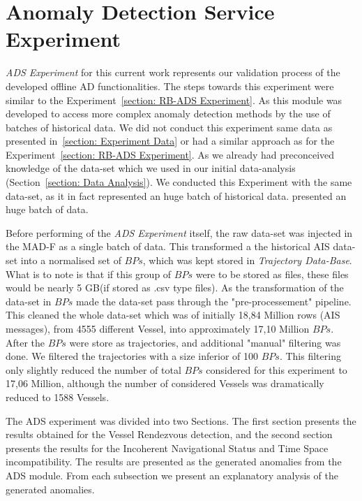 \section{Anomaly Detection Service Experiment}
\emph{ADS Experiment} for this current work represents our validation process of the developed offline AD functionalities. The steps towards this experiment were similar to the Experiment~\ref{section: RB-ADS Experiment}. As this module was developed to access more complex anomaly detection methods by the use of batches of historical data. We did not conduct this experiment same data as presented in~\ref{section: Experiment Data} or had a similar approach as for the Experiment~\ref{section: RB-ADS Experiment}.
As we already had preconceived knowledge of the data-set which we used in our initial data-analysis (Section~\ref{section: Data Analysis}). We conducted this Experiment with the same data-set, as it in fact represented an huge batch of historical data.
presented an huge batch of data. 

Before performing of the \emph{ADS Experiment} itself, the raw data-set was injected in the MAD-F as a single batch of data. This transformed a the historical AIS data-set into a normalised set of $BPs$, which was kept stored in \emph{Trajectory Data-Base}. What is to note is that if this group of $BPs$ were to be stored as files, these files would be nearly 5 GB(if stored as .csv type files).
As the transformation of the data-set in $BPs$ made the data-set pass through the "pre-processement" pipeline. This cleaned the whole data-set which was of initially 18,84 Million rows (AIS messages), from 4555 different Vessel, into approximately 17,10 Million $BPs$.
After the $BPs$ were store as trajectories, and additional "manual" filtering was done. We filtered the trajectories with a size inferior of 100 $BPs$. This filtering only slightly reduced the number of total $BPs$ considered for this experiment to 17,06 Million, although the number of considered Vessels was dramatically reduced to 1588 Vessels.

The ADS experiment was divided into two Sections. The first section presents the results obtained for the Vessel Rendezvous detection, and the second section presents the results for the Incoherent Navigational Status and Time Space incompatibility. The results are presented as the generated anomalies from the ADS module. From each subsection we present an explanatory analysis of the generated anomalies.  

